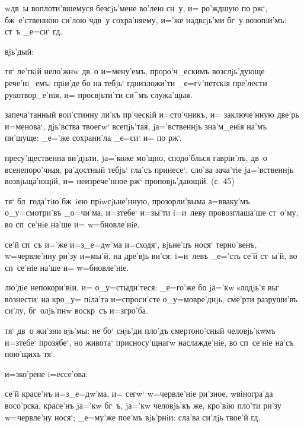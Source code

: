  w\т дв~ы воплоти'вшемуся без\ъ сjь'мене во'лею 
сн~у, и= ро'ждшую по рж`, бж~е'ственною си'лою 
ч дв~у сохра'няему, и='же над\ъ всjь'ми бг~у 
возопiи'мъ: ст~ъ _е=си` гд.

   вjь'дый:

 тя` ле'гкiй нело'жнw дв~о и=мену'емъ, 
проро'ч_ескимъ возслjь'дующе рече'нi_емъ: прiи'де бо на 
тебjь` гд низложи'ти _е=гv'петскiя пре'лести 
рукотвор_е'нiя, и= просвjьти'ти си^мъ служа'щыя.

 запеча'танный вои'стинну ли'къ пр'ческiй 
и=сто'чникъ, и= заключе'нную две'рь и=менова`, дjь'вства 
твоегw` всепjь'тая, jа='вственнjь зна'м_енiя на'мъ 
пи'шуще: _е='же сохрани'ла _е=си` и= по рж`.

 пресу'щественна ви'дjьти, jа='коже мо'щно, 
сподо'блься гаврiи'лъ, дв~о всенепоро'чная, ра'достный 
тебjь` гла'съ принесе`, сло'ва зача'тiе jа='вственнjь 
возвjьща'ющiй, и= неизрече'нное рж` проповjь'дающiй. 
(с. 45)


 тя` бл~года'тiю бж~iею 
прiwсjьне'нную, прозорли'выма а=вваку'мъ о_у=смотри'въ 
_о=чи'ма, и=з\ъ тебе` и=зы'ти i=и~леву провозглаша'ше 
ст~о'му, во сп~се'нiе на'ше и= w=бновле'нiе.

 се'й сп~съ и='же и=з\ъ _е=дw'ма и=сходя`, 
вjьне'цъ нося` терно'венъ, w=червле'нну ри'зу и=мы'й, на 
дре'вjь ви'ся; i=и~левъ _е='сть се'й ст~ы'й, во сп~се'нiе 
на'ше и= w=бновле'нiе.

 лю'дiе непокори'вiи, и= о_у=стыди'теся: 
_е=го'же бо jа='кw sлодjь'я вы` вознести` на кр о_у= 
пiла'та и=спроси'сте о_у=мовре'днjь, сме'рти разруши'въ 
си'лу, бг~олjь'пнw воскр~съ и=з\ъ гро'ба.

  тя` дв~о жи'зни вjь'мы: не бо` 
снjь'ди пло'дъ смертоно'сный человjь'кwмъ и=з\ъ тебе` 
прозябе`, но живота` присносу'щнагw наслажде'нiе, во 
сп~се'нiе на'съ пою'щихъ тя`.

   и=з\ъ ко'рене i=ессе'ова:

 се'й красе'нъ и=з\ъ _е=дw'ма, и= сегw` 
w=червле'нiе ри'зное, w\т вiногра'да восо'рска, красе'нъ 
jа='кw бг~ъ, jа='кw человjь'къ же, кро'вiю пло'ти ри'зу 
w=червле'ну нося`; _е=му'же пое'мъ вjь'рнiи: сла'ва 
си'лjь твое'й гд.

